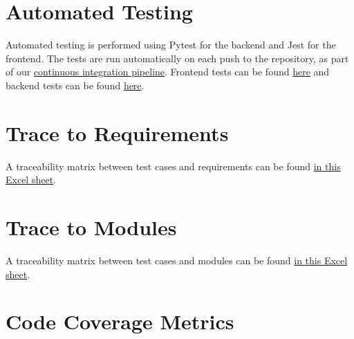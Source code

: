 \documentclass[12pt, titlepage]{article}
\begin{document}
\section{Automated Testing}

Automated testing is performed using Pytest for the backend and Jest for the
frontend. The tests are run automatically on each push to the repository, as
part of our
\href{https://github.com/PlutosCapstone/Plutos/tree/main/.github/workflows}{continuous
integration pipeline}. Frontend tests can be found
\href{https://github.com/PlutosCapstone/Plutos/tree/main/src/client/tests}{here}
and backend tests can be found
\href{https://github.com/PlutosCapstone/Plutos/tree/main/src/server/tests}{here}.

		
\section{Trace to Requirements}

A traceability matrix between test cases and requirements can be found
\href{https://github.com/PlutosCapstone/Plutos/blob/main/docs/VnVPlan/traceability_tests_and_requirements.xlsx}{in
this Excel sheet}.
		
\section{Trace to Modules}		

A traceability matrix between test cases and modules can be found
\href{https://github.com/PlutosCapstone/Plutos/blob/main/docs/VnVPlan/requirements_to_modules_traceability.xlsx}{in
this Excel sheet}.

\newpage

\section{Code Coverage Metrics}
\end{document}
